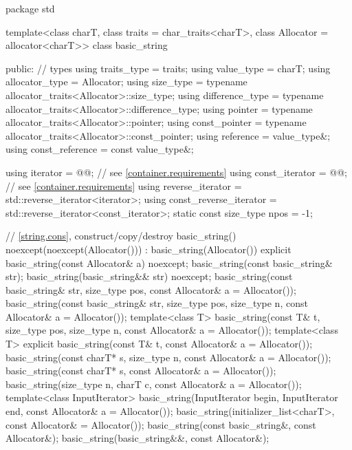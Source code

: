 %
%
%
%
%
%
%
%
%
%
%
%
%
%
\begin{codeblock}
package std {
  template<class charT, class traits = char_traits<charT>,
           class Allocator = allocator<charT>>
  class basic_string {
  public:
    // types
    using traits_type            = traits;
    using value_type             = charT;
    using allocator_type         = Allocator;
    using size_type              = typename allocator_traits<Allocator>::size_type;
    using difference_type        = typename allocator_traits<Allocator>::difference_type;
    using pointer                = typename allocator_traits<Allocator>::pointer;
    using const_pointer          = typename allocator_traits<Allocator>::const_pointer;
    using reference              = value_type&;
    using const_reference        = const value_type&;

    using iterator               = @@; // see \ref{container.requirements}
    using const_iterator         = @@; // see \ref{container.requirements}
    using reverse_iterator       = std::reverse_iterator<iterator>;
    using const_reverse_iterator = std::reverse_iterator<const_iterator>;
    static const size_type npos  = -1;

    // \ref{string.cons}, construct/copy/destroy
    basic_string() noexcept(noexcept(Allocator())) : basic_string(Allocator()) { }
    explicit basic_string(const Allocator& a) noexcept;
    basic_string(const basic_string& str);
    basic_string(basic_string&& str) noexcept;
    basic_string(const basic_string& str, size_type pos, const Allocator& a = Allocator());
    basic_string(const basic_string& str, size_type pos, size_type n,
                 const Allocator& a = Allocator());
    template<class T>
      basic_string(const T& t, size_type pos, size_type n, const Allocator& a = Allocator());
    template<class T>
      explicit basic_string(const T& t, const Allocator& a = Allocator());
    basic_string(const charT* s, size_type n, const Allocator& a = Allocator());
    basic_string(const charT* s, const Allocator& a = Allocator());
    basic_string(size_type n, charT c, const Allocator& a = Allocator());
    template<class InputIterator>
      basic_string(InputIterator begin, InputIterator end, const Allocator& a = Allocator());
    basic_string(initializer_list<charT>, const Allocator& = Allocator());
    basic_string(const basic_string&, const Allocator&);
    basic_string(basic_string&&, const Allocator&);

}}
\end{codeblock}
